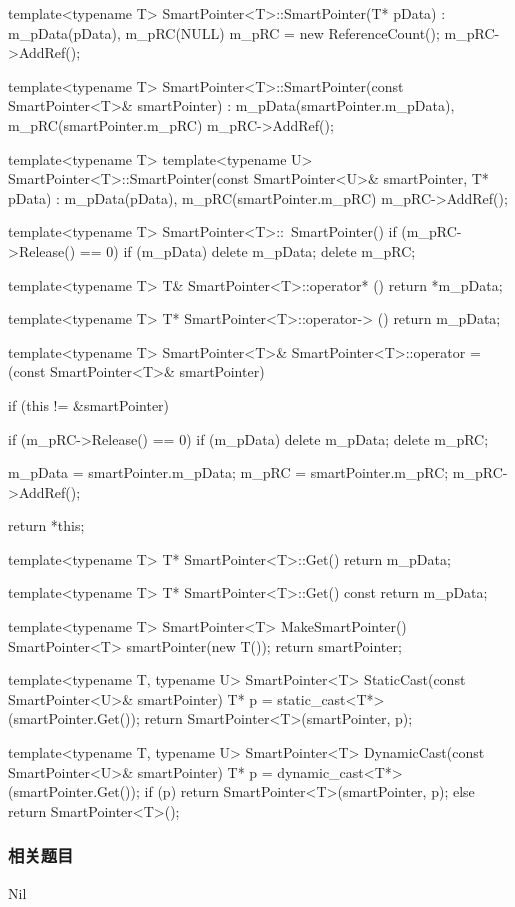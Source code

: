 \begin{Code}
template<typename T>
SmartPointer<T>::SmartPointer(T* pData)
    : m_pData(pData), m_pRC(NULL)
{
    m_pRC = new ReferenceCount();
    m_pRC->AddRef();
}

template<typename T>
SmartPointer<T>::SmartPointer(const SmartPointer<T>& smartPointer)
    : m_pData(smartPointer.m_pData), m_pRC(smartPointer.m_pRC)
{
    m_pRC->AddRef();
}

template<typename T>
template<typename U>
SmartPointer<T>::SmartPointer(const SmartPointer<U>& smartPointer, T* pData)
    : m_pData(pData), m_pRC(smartPointer.m_pRC)
{
    m_pRC->AddRef();
}

template<typename T>
SmartPointer<T>::~SmartPointer()
{
    if (m_pRC->Release() == 0)
    {
        if (m_pData)
            delete m_pData;
        delete m_pRC;
    }
}

template<typename T>
T& SmartPointer<T>::operator* ()
{
    return *m_pData;
}

template<typename T>
T* SmartPointer<T>::operator-> ()
{
    return m_pData;
}

template<typename T>
SmartPointer<T>& SmartPointer<T>::operator = (const SmartPointer<T>& smartPointer)
{
    if (this != &smartPointer)
    {
        if (m_pRC->Release() == 0)
        {
            if (m_pData)
                delete m_pData;
            delete m_pRC;
        }

        m_pData = smartPointer.m_pData;
        m_pRC = smartPointer.m_pRC;
        m_pRC->AddRef();
    }
    return *this;
}

template<typename T>
T* SmartPointer<T>::Get()
{
    return m_pData;
}

template<typename T>
T* SmartPointer<T>::Get() const
{
 return m_pData;
}

template<typename T>
SmartPointer<T> MakeSmartPointer()
{
    SmartPointer<T> smartPointer(new T());
    return smartPointer;
}

template<typename T, typename U>
SmartPointer<T> StaticCast(const SmartPointer<U>& smartPointer)
{
    T* p = static_cast<T*>(smartPointer.Get());
    return SmartPointer<T>(smartPointer, p);
}

template<typename T, typename U>
SmartPointer<T> DynamicCast(const SmartPointer<U>& smartPointer)
{
    T* p = dynamic_cast<T*>(smartPointer.Get());
    if (p)
        return SmartPointer<T>(smartPointer, p);
    else
        return SmartPointer<T>();
}
\end{Code}


\subsubsection{相关题目}
Nil